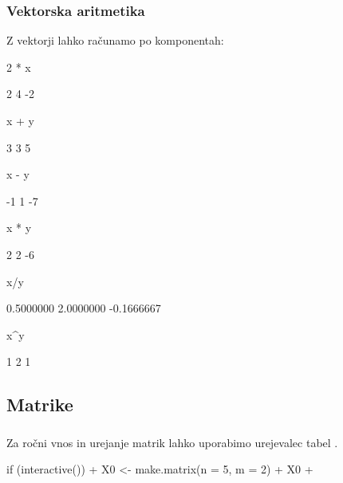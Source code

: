\begin{frame}[fragile]
\frametitle{Vektorska aritmetika}
Z vektorji lahko računamo po komponentah:

\begin{Schunk}
\begin{Sinput}
 2 * x
\end{Sinput}
\begin{Soutput}
[1]  2  4 -2
\end{Soutput}
\begin{Sinput}
 x + y
\end{Sinput}
\begin{Soutput}
[1] 3 3 5
\end{Soutput}
\begin{Sinput}
 x - y
\end{Sinput}
\begin{Soutput}
[1] -1  1 -7
\end{Soutput}
\begin{Sinput}
 x * y
\end{Sinput}
\begin{Soutput}
[1]  2  2 -6
\end{Soutput}
\begin{Sinput}
 x/y
\end{Sinput}
\begin{Soutput}
[1]  0.5000000  2.0000000 -0.1666667
\end{Soutput}
\begin{Sinput}
 x^y
\end{Sinput}
\begin{Soutput}
[1] 1 2 1
\end{Soutput}
\end{Schunk}
\end{frame}


\subsection{Matrike}

\begin{frame}[fragile]
\frametitle{}
Za ročni vnos in urejanje matrik lahko uporabimo urejevalec tabel .

\begin{Schunk}
\begin{Sinput}
 if (interactive()) {
+     X0 <- make.matrix(n = 5, m = 2)
+     X0
+ }
\end{Sinput}
\end{Schunk}
\end{frame}

